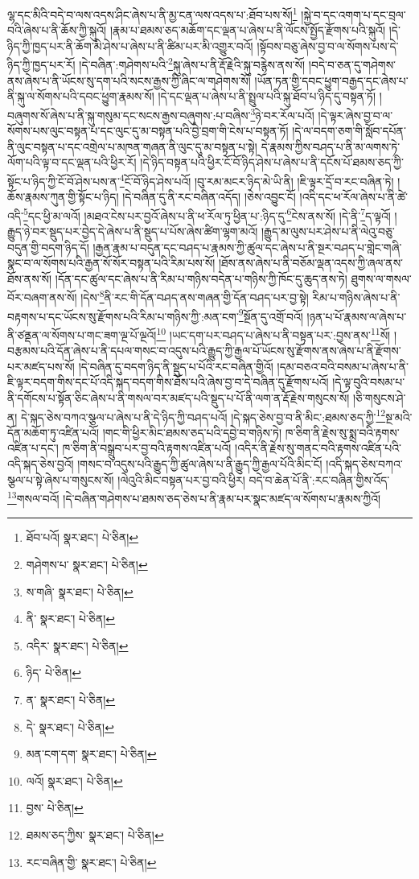 ལྷ་དང་མིའི་བདེ་བ་ལས་འདས་ཤིང་ཞེས་པ་ནི་མྱ་ངན་ལས་འདས་པ་:ཐོབ་པས་སོ།\footnote{ཐོབ་པའོ།  སྣར་ཐང་།  པེ་ཅིན། } །སྐྱེ་བ་དང་འགག་པ་དང་བྲལ་བའི་ཞེས་པ་ནི་ཆོས་ཀྱི་སྐུའོ། །རྣམ་པ་ཐམས་ཅད་མཆོག་དང་ལྡན་པ་ཞེས་པ་ནི་ལོངས་སྤྱོད་རྫོགས་པའི་སྐུའོ། །དེ་ཉིད་ཀྱི་ཁྱད་པར་ནི་ཆོག་མི་ཤེས་པ་ཞེས་པ་ནི་ཚིམ་པར་མི་འགྱུར་བའོ། །སྟོབས་བཅུ་ཞེས་བྱ་བ་ལ་སོགས་པས་དེ་ཉིད་ཀྱི་ཁྱད་པར་རོ། །དེ་བཞིན་:གཤེགས་པའི་\footnote{གཤེགས་པ་  སྣར་ཐང་།  པེ་ཅིན། }སྐུ་ཞེས་པ་ནི་རྡོ་རྗེའི་སྐུ་བརྙེས་ནས་སོ། །བདེ་བ་ཅན་དུ་གཤེགས་ནས་ཞེས་པ་ནི་ཡོངས་སུ་དག་པའི་སངས་རྒྱས་ཀྱི་ཞིང་ལ་གཤེགས་སོ། །ཡོན་ཏན་གྱི་དབང་ཕྱུག་བརྒྱད་དང་ཞེས་པ་ནི་སྐུ་ལ་སོགས་པའི་དབང་ཕྱུག་རྣམས་སོ། །དེ་དང་ལྡན་པ་ཞེས་པ་ནི་སྤྲུལ་པའི་སྐུ་ཐོབ་པ་ཉིད་དུ་བསྟན་ཏོ། །བཞུགས་སོ་ཞེས་པ་ནི་སྐུ་གསུམ་དང་སངས་རྒྱས་བཞུགས་:པ་བཞིས་\footnote{ས་གཞི་  སྣར་ཐང་།  པེ་ཅིན། }ཉེ་བར་རོལ་པའོ། །དེ་ལྟར་ཞེས་བྱ་བ་ལ་སོགས་པས་ལུང་བསྟན་པ་དང་ལུང་དུ་མ་བསྟན་པའི་བྱེ་བྲག་གི་ངེས་པ་བསྟན་ཏོ། །དེ་ལ་བདག་ཅག་གི་སློབ་དཔོན་ནི་ལུང་བསྟན་པ་དང་འགྲེལ་པ་མཁན་གཞན་ནི་ལུང་དུ་མ་བསྟན་པ་སྟེ། དེ་རྣམས་ཀྱིས་བཤད་པ་ནི་མ་ལགས་ཏེ་ལོག་པའི་ལྟ་བ་དང་ལྡན་པའི་ཕྱིར་རོ། །དེ་ཉིད་བསྟན་པའི་ཕྱིར་ངོ་བོ་ཉིད་ཤེས་པ་ཞེས་པ་ནི་དངོས་པོ་ཐམས་ཅད་ཀྱི་སྟོང་པ་ཉིད་ཀྱི་ངོ་བོ་ཤེས་པས་ན་\footnote{ནི་  སྣར་ཐང་།  པེ་ཅིན། }ངོ་བོ་ཉིད་ཤེས་པའོ། །བུ་རམ་མངར་ཉིད་མེ་ཡི་ནི། །ཇི་ལྟར་དྲོ་བ་རང་བཞིན་ཏེ། །ཆོས་རྣམས་ཀུན་གྱི་སྟོང་པ་ཉིད། །དེ་བཞིན་དུ་ནི་རང་བཞིན་འདོད། །ཅེས་འབྱུང་ངོ། །འདི་དང་ཕ་རོལ་ཞེས་པ་ནི་ཚེ་འདི་\footnote{འདིར་  སྣར་ཐང་།  པེ་ཅིན། }དང་ཕྱི་མ་ལའོ། །མཐའ་ངེས་པར་བྱའོ་ཞེས་པ་ནི་ཕ་རོལ་ཏུ་ཕྱིན་པ་:ཉིད་དུ་\footnote{ཉིད་  པེ་ཅིན། }ངེས་ནས་སོ། །དེ་ནི་\footnote{ན་  སྣར་ཐང་།  པེ་ཅིན། }ད་ལྟའོ། །རྒྱུད་ཉེ་བར་སྡུད་པར་བྱེད་དེ་ཞེས་པ་ནི་སྡུད་པ་པོས་ཞེས་ཚིག་ལྷག་མའོ། །རྒྱུད་མ་ལུས་པར་ཤེས་པ་ནི་ལེའུ་བཅུ་བདུན་གྱི་བདག་ཉིད་དོ། །རྒྱན་རྣམ་པ་བདུན་དང་བཤད་པ་རྣམས་ཀྱི་ཚུལ་དང་ཞེས་པ་ནི་སྔར་བཤད་པ་གླེང་གཞི་སྣང་བ་ལ་སོགས་པའི་རྒྱན་སོ་སོར་བསྟན་པའི་རིམ་པས་སོ། །ཐོས་ནས་ཞེས་པ་ནི་བཅོམ་ལྡན་འདས་ཀྱི་ཞལ་ནས་ཐོས་ནས་སོ། །དོན་དང་ཚུལ་དང་ཞེས་པ་ནི་རིམ་པ་གཉིས་བདེན་པ་གཉིས་ཀྱི་ཁོང་དུ་ཆུད་ནས་ཏེ། ཐུགས་ལ་གསལ་བོར་བཞག་ནས་སོ། །དེས་\footnote{དེ་  སྣར་ཐང་།  པེ་ཅིན། }ནི་རང་གི་དོན་བཤད་ནས་གཞན་གྱི་དོན་བཤད་པར་བྱ་སྟེ། རིམ་པ་གཉིས་ཞེས་པ་ནི་བརྟགས་པ་དང་ཡོངས་སུ་རྫོགས་པའི་རིམ་པ་གཉིས་ཀྱི་:མན་ངག་\footnote{མན་ངག་དག་  སྣར་ཐང་།  པེ་ཅིན། }སྔོན་དུ་འགྲོ་བའོ། །ཉན་པ་པོ་རྣམས་ལ་ཞེས་པ་ནི་ཙནྡན་ལ་སོགས་པ་གང་ཟག་ལྔ་པོ་ལྔའོ།\footnote{ལའོ།  སྣར་ཐང་།  པེ་ཅིན། } །ཡང་དག་པར་བཤད་པ་ཞེས་པ་ནི་བསྟན་པར་:བྱས་ནས་\footnote{བྱས་  པེ་ཅིན། }སོ། །བརྩམས་པའི་དོན་ཞེས་པ་ནི་དཔལ་གསང་བ་འདུས་པའི་རྒྱུད་ཀྱི་རྒྱལ་པོ་ཡོངས་སུ་རྫོགས་ནས་ཞེས་པ་ནི་རྫོགས་པར་མཛད་པས་སོ། །དེ་བཞིན་དུ་བདག་ཉིད་ནི་སྡུད་པ་པོའི་རང་བཞིན་གྱིའོ། །དམ་བཅའ་བའི་བསམ་པ་ཞེས་པ་ནི་ཇི་ལྟར་བདག་གིས་དང་པོ་འདི་སྐད་བདག་གིས་ཐོས་པའི་ཞེས་བྱ་བ་དེ་བཞིན་དུ་རྫོགས་པའོ། །དེ་ལྟ་བུའི་བསམ་པ་ནི་དགོངས་པ་སྟོན་ཅིང་ཞེས་པ་ནི་གསལ་བར་མཛད་པའི་སྡུད་པ་པོ་ནི་ལག་ན་རྡོ་རྗེས་གསུངས་སོ། །ཅི་གསུངས་ཤེ་ན། དེ་སྐད་ཅེས་བཀའ་སྩལ་པ་ཞེས་པ་ནི་དེ་ཉིད་ཀྱི་བཤད་པའོ། །དེ་སྐད་ཅེས་བྱ་བ་ནི་མིང་:ཐམས་ཅད་ཀྱི་\footnote{ཐམས་ཅད་ཀྱིས་  སྣར་ཐང་།  པེ་ཅིན། }སྔ་མའི་དོན་མཆོག་ཏུ་འཛིན་པའོ། །གང་གི་ཕྱིར་མིང་ཐམས་ཅད་པའི་དབྱེ་བ་གཉིས་ཏེ། ཁ་ཅིག་ནི་རྗེས་སུ་སྨྲ་བའི་རྟགས་འཛིན་པ་དང་། ཁ་ཅིག་ནི་བསྒྲུབ་པར་བྱ་བའི་རྟགས་འཛིན་པའོ། །འདིར་ནི་རྗེས་སུ་གནང་བའི་རྟགས་འཛིན་པའི་འདི་སྐད་ཅེས་བྱའོ། །གསང་བ་འདུས་པའི་རྒྱུད་ཀྱི་ཚུལ་ཞེས་པ་ནི་རྒྱུད་ཀྱི་རྒྱལ་པོའི་མིང་ངོ། །འདི་སྐད་ཅེས་བཀའ་སྩལ་པ་སྟེ་ཞེས་པ་གསུངས་སོ། །ལེའུའི་མིང་བསྟན་པར་བྱ་བའི་ཕྱིར། བདེ་བ་ཆེན་པོ་ནི་:རང་བཞིན་གྱིས་འོད་\footnote{རང་བཞིན་གྱི་  སྣར་ཐང་།  པེ་ཅིན། }གསལ་བའོ། །དེ་བཞིན་གཤེགས་པ་ཐམས་ཅད་ཅེས་པ་ནི་རྣམ་པར་སྣང་མཛད་ལ་སོགས་པ་རྣམས་ཀྱིའོ། 
